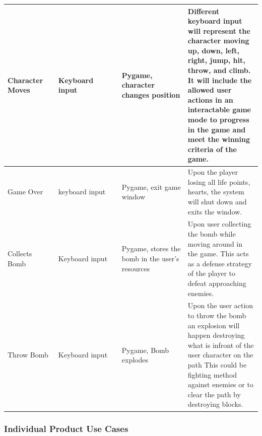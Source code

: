 \documentclass[12pt, titlepage]{article}
\begin{document}
\begin{longtable}{|p{0.2\linewidth}|p{0.25\linewidth}|p{0.26\linewidth}|p{0.3\linewidth}|}
	\hline 
	Character Moves & Keyboard input & Pygame, character changes position & Different keyboard input will represent the character moving up, down, left, right, jump, hit, throw, and climb. It will include the allowed user actions in an interactable game mode to progress in the game and meet the winning criteria of the game.\\
	\hline
	Game Over & keyboard input & Pygame, exit game window & Upon the player losing all life points, hearts, the system will shut down and exits the window.\\
	\hline
	Collects Bomb & Keyboard input & Pygame, stores the bomb in the user's resources & Upon user collecting the bomb while moving around in the game. This acts as a defense strategy of the player to defeat approaching enemies. \\
	\hline
	Throw Bomb & Keyboard input & Pygame, Bomb explodes & Upon the user action to throw the bomb an explosion will happen destroying what is infront of the user character on the path This could be fighting method against enemies or to clear the path by destroying blocks.\\
	\hline
\end{longtable}

\newpage

\subsubsection{Individual Product Use Cases}
\end{document}
